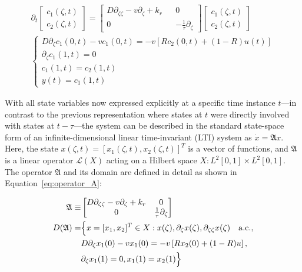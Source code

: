 \begin{align}
    \partial_t 
    \begin{bmatrix}
        c_1(\zeta, t) \\ c_2(\zeta,t)
    \end{bmatrix}
    =
    \begin{bmatrix}
        D \partial_{\zeta \zeta} - v \partial_\zeta + k_r && 0 \\
        0 && -\frac{1}{\tau} \partial_\zeta
    \end{bmatrix}
    \begin{bmatrix}
        c_1(\zeta, t) \\ c_2(\zeta,t)
    \end{bmatrix}\\
\begin{cases}
    D \partial_\zeta c_1(0, t) - v c_1(0, t) = -v \left[ R c_2(0, t) + (1-R) u(t) \right] \\
    \partial_\zeta c_1(1, t) = 0 \\
    c_1(1,t) = c_2(1,t) \\
    y(t) = c_1(1, t)
\end{cases}
\end{align}

With all state variables now expressed explicitly at a specific time instance $t$—in contrast to the previous representation where states at $t$ were directly involved with states at $t-\tau$—the system can be described in the standard state-space form of an infinite-dimensional linear time-invariant (LTI) system as $\dot{x} = \mathfrak{A} x$. Here, the state $x(\zeta, t) = [x_1(\zeta, t), x_2(\zeta, t)]^T$ is a vector of functions, and $\mathfrak{A}$ is a linear operator $\mathcal{L}(X)$ acting on a Hilbert space $X: L^2[0,1] \times L^2[0,1]$. The operator $\mathfrak{A}$ and its domain are defined in detail as shown in Equation~\ref{eq:operator_A}:

\begin{equation} \label{eq:operator_A}
    \begin{aligned}
        \mathfrak{A} \equiv&
        \begin{bmatrix}
            D \partial_{\zeta \zeta} - v \partial_\zeta + k_r & 0 \\
            0 & \frac{1}{\tau} \partial_\zeta
        \end{bmatrix}\\
        D(\mathfrak{A}) =& \Bigl\{ x = [x_1, x_2]^T \in X:
        x(\zeta), \partial_\zeta x(\zeta), \partial_{\zeta \zeta} x(\zeta) \quad \mathrm{a.c.},\\
        &D \partial_\zeta x_1(0) - v x_1(0) = -v \left[ R x_2(0) + (1-R) u \right],\\
        &\partial_\zeta x_1(1) = 0,
        x_1(1) = x_2(1) \Bigr\}
    \end{aligned}
\end{equation}

